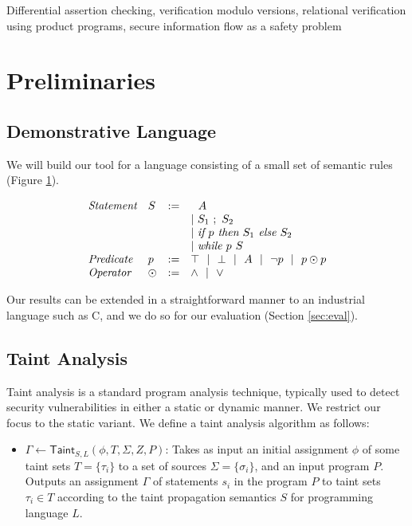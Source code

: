 \documentclass[letterpaper,twocolumn,10pt]{article}
\begin{document}
Differential assertion checking, verification modulo versions, relational verification using product programs, secure information flow as a safety problem

\section{Preliminaries}

\subsection{Demonstrative Language}

We will build our tool for a language consisting of a small set of semantic rules (Figure \ref{fig:semrules}).

\begin{figure}
\label{fig:semrules}
\caption{}
\[
	\begin{array}{l l c l}
		\emph{Statement} & S & := & 
			\ \ A \\
			& & & |~ S_1\ ;\ S_2 \\
			& & & |~ \emph{if }p\emph{ then } S_1 \emph{ else } S_2 \\
			& & & |~ \emph{while }p\emph{ } S \\
		\emph{Predicate} & p &:=& \top ~~|~~ \bot ~~|~~ A ~~|~~ \lnot p ~~|~~ p \odot p \\
		\emph{Operator} & \odot &:=& \land ~~|~~ \lor \\
	\end{array}
\]
\end{figure}

Our results can be extended in a straightforward manner to an industrial language such as C, and we do so for our evaluation (Section \ref{sec:eval}).

\subsection{Taint Analysis}

Taint analysis is a standard program analysis technique, typically used to detect security vulnerabilities in either a static or dynamic manner. 
We restrict our focus to the static variant. We define a taint analysis algorithm as follows:

\begin{itemize}
    \item $\Gamma \gets \mathsf{Taint}_{S,L}(\phi, T, \Sigma, Z, P)$: Takes as input an initial assignment $\phi$ of some taint sets $T = \{\tau_i\}$ to 
    a set of sources $\Sigma = \{\sigma_i\}$, and an input program $P$. Outputs an 
    assignment $\Gamma$ of statements $s_i$ in the program $P$ to taint sets $\tau_i \in T$ according to the taint propagation semantics $S$ for programming
    language $L$.
\end{itemize}
\end{document}
